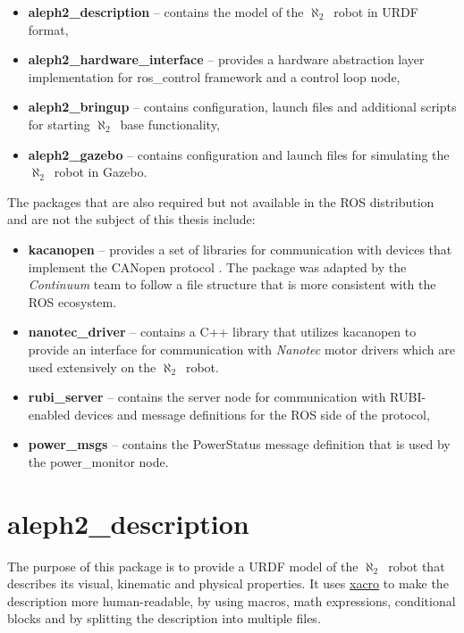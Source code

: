 \documentclass[english,inz,shortabstract]{iithesis}
\newcommand{\val}[1]{\textbf{\textsf{#1}}}
\newcommand{\rovername}{$\aleph_2$\ }
\begin{document}
	\begin{itemize}
		\item \val{aleph2\_description} -- 
		contains the model of the \rovername robot in URDF format,
		\item \val{aleph2\_hardware\_interface} -- 
		provides a hardware abstraction layer implementation for \textsf{ros\_control} framework and a control loop node,
		\item \val{aleph2\_bringup} -- 
		contains configuration, launch files and additional scripts for starting \rovername base functionality,
		\item \val{aleph2\_gazebo} -- 
		contains configuration and launch files for simulating the \rovername robot in Gazebo.
	\end{itemize}

	The packages that are also required but not available in the ROS distribution and are not the subject of this thesis include:

	\begin{itemize}
		\item \val{kacanopen} -- provides a set of libraries for communication with devices that implement the CANopen protocol \cite{kacanopen2016}. The package was adapted by the \textit{Continuum} team to follow a file structure that is more consistent with the ROS ecosystem. 
		\item \val{nanotec\_driver} -- contains a C++ library that utilizes \textsf{kacanopen} to provide an interface for communication with \textit{Nanotec} motor drivers which are used extensively on the \rovername robot.
		\item \val{rubi\_server} -- contains the server node for communication with RUBI-enabled devices and message definitions for the ROS side of the protocol,
		\item \val{power\_msgs} -- contains the \textsf{PowerStatus} message definition that is used by the \textsf{power\_monitor} node.
	\end{itemize}


\section{aleph2\_description}

	The purpose of this package is to provide a URDF model of the \rovername robot that describes its visual, kinematic and physical properties. It uses \href{http://wiki.ros.org/xacro}{\textsf{xacro}} to make the description more human-readable, by using macros, math expressions, conditional blocks and by splitting the description into multiple files. 
\end{document}
